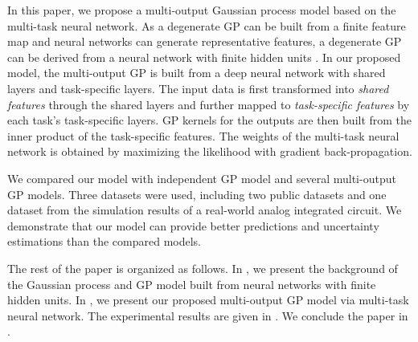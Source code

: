 In this paper, we propose a multi-output Gaussian process model based on the multi-task neural network. As a degenerate GP can be built from a finite feature map and neural networks can generate representative features, a degenerate GP can be derived from a neural network with finite hidden units \cite{lazaro2010marginalized, huang2015scalable}. In our proposed model, the multi-output GP is built from a deep neural network with shared layers and task-specific layers. The input data is first transformed into \emph{shared features} through the shared layers and further mapped to \emph{task-specific features} by each task's task-specific layers. GP kernels for the outputs are then built from the inner product of the task-specific features. The weights of the multi-task neural network is obtained by maximizing the likelihood with gradient back-propagation.

We compared our model with independent GP model and several multi-output GP models. Three datasets were used, including two public datasets and one dataset from the simulation results of a real-world analog integrated circuit. We demonstrate that our model can provide better predictions and uncertainty estimations than the compared models.

The rest of the paper is organized as follows. In , we present the background of the Gaussian process and GP model built from neural networks with finite hidden units. In , we present our proposed multi-output GP model via multi-task neural network. The experimental results are given in . We conclude the paper in .


